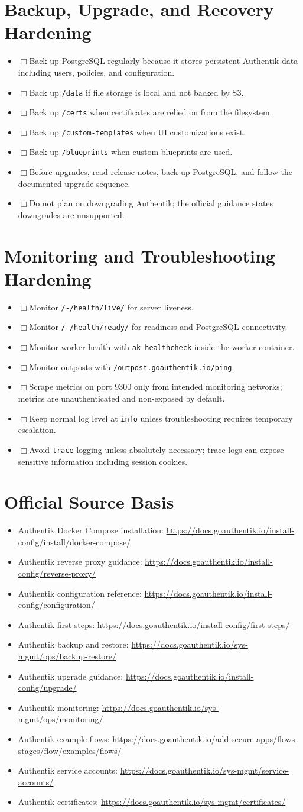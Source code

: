 \documentclass[11pt]{article}
\newcommand{\checkbox}{$\Box$\hspace{0.4em}}
\newcommand{\sourcebasis}{\section*{Official Source Basis}\begin{itemize}
\item Authentik Docker Compose installation: \url{https://docs.goauthentik.io/install-config/install/docker-compose/}
\item Authentik reverse proxy guidance: \url{https://docs.goauthentik.io/install-config/reverse-proxy/}
\item Authentik configuration reference: \url{https://docs.goauthentik.io/install-config/configuration/}
\item Authentik first steps: \url{https://docs.goauthentik.io/install-config/first-steps/}
\item Authentik backup and restore: \url{https://docs.goauthentik.io/sys-mgmt/ops/backup-restore/}
\item Authentik upgrade guidance: \url{https://docs.goauthentik.io/install-config/upgrade/}
\item Authentik monitoring: \url{https://docs.goauthentik.io/sys-mgmt/ops/monitoring/}
\item Authentik example flows: \url{https://docs.goauthentik.io/add-secure-apps/flows-stages/flow/examples/flows/}
\item Authentik service accounts: \url{https://docs.goauthentik.io/sys-mgmt/service-accounts/}
\item Authentik certificates: \url{https://docs.goauthentik.io/sys-mgmt/certificates/}
\end{itemize}}
\begin{document}
\section*{Backup, Upgrade, and Recovery Hardening}
\begin{itemize}
\item \checkbox Back up PostgreSQL regularly because it stores persistent Authentik data including users, policies, and configuration.
\item \checkbox Back up \texttt{/data} if file storage is local and not backed by S3.
\item \checkbox Back up \texttt{/certs} when certificates are relied on from the filesystem.
\item \checkbox Back up \texttt{/custom-templates} when UI customizations exist.
\item \checkbox Back up \texttt{/blueprints} when custom blueprints are used.
\item \checkbox Before upgrades, read release notes, back up PostgreSQL, and follow the documented upgrade sequence.
\item \checkbox Do not plan on downgrading Authentik; the official guidance states downgrades are unsupported.
\end{itemize}

\section*{Monitoring and Troubleshooting Hardening}
\begin{itemize}
\item \checkbox Monitor \texttt{/-/health/live/} for server liveness.
\item \checkbox Monitor \texttt{/-/health/ready/} for readiness and PostgreSQL connectivity.
\item \checkbox Monitor worker health with \texttt{ak healthcheck} inside the worker container.
\item \checkbox Monitor outposts with \texttt{/outpost.goauthentik.io/ping}.
\item \checkbox Scrape metrics on port 9300 only from intended monitoring networks; metrics are unauthenticated and non-exposed by default.
\item \checkbox Keep normal log level at \texttt{info} unless troubleshooting requires temporary escalation.
\item \checkbox Avoid \texttt{trace} logging unless absolutely necessary; trace logs can expose sensitive information including session cookies.
\end{itemize}

\sourcebasis
\end{document}
